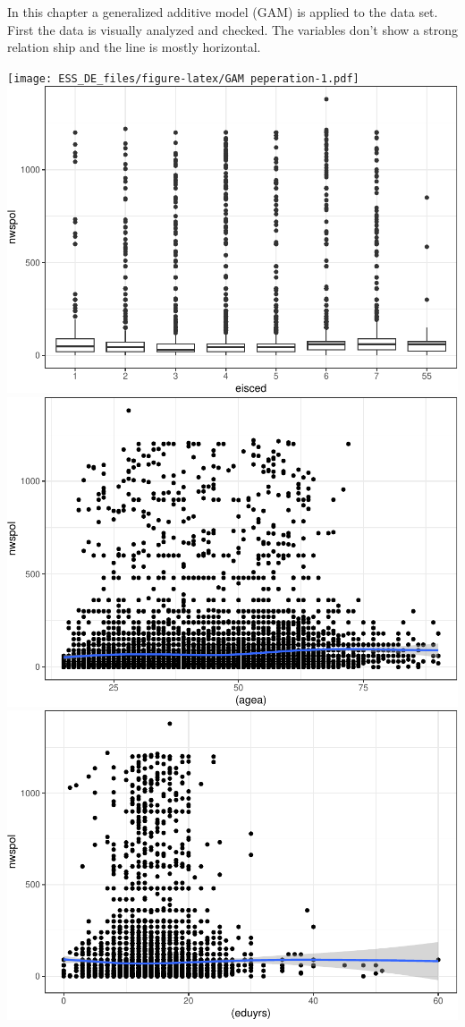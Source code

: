 \documentclass[
]{article}
\begin{document}
In this chapter a generalized additive model (GAM) is applied to the
data set. First the data is visually analyzed and checked. The variables
don't show a strong relation ship and the line is mostly horizontal.

\texttt{[image: ESS\_DE\_files/figure-latex/GAM peperation-1.pdf]}
\includegraphics{ESS_DE_files/figure-latex/GAM peperation-2.pdf}
\includegraphics{ESS_DE_files/figure-latex/GAM peperation-3.pdf}
\includegraphics{ESS_DE_files/figure-latex/GAM peperation-4.pdf}
\end{document}
